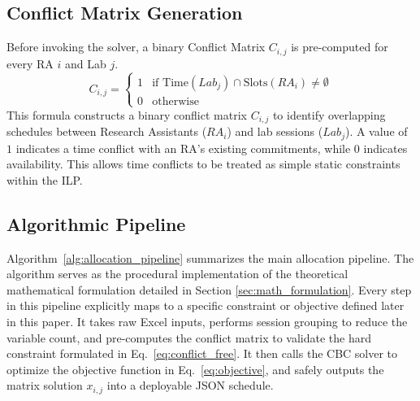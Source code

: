 \documentclass[journal,onecolumn]{IEEEtran}
\begin{document}
\subsection{Conflict Matrix Generation}
Before invoking the solver, a binary Conflict Matrix $C_{i,j}$ is pre-computed for every RA $i$ and Lab $j$.
\begin{equation}
C_{i,j} =
\begin{cases}
1 & \text{if } \text{Time}(Lab_j) \cap \text{Slots}(RA_i) \neq \emptyset \\
0 & \text{otherwise}
\end{cases}
\label{eq:conflict_matrix}
\end{equation}
This formula constructs a binary conflict matrix $C_{i,j}$ to identify overlapping schedules between Research Assistants ($RA_i$) and lab sessions ($Lab_j$). A value of $1$ indicates a time conflict with an RA's existing commitments, while $0$ indicates availability. This allows time conflicts to be treated as simple static constraints within the ILP.

\subsection{Algorithmic Pipeline}
Algorithm~\ref{alg:allocation_pipeline} summarizes the main allocation pipeline. The algorithm serves as the procedural implementation of the theoretical mathematical formulation detailed in Section \ref{sec:math_formulation}. Every step in this pipeline explicitly maps to a specific constraint or objective defined later in this paper. It takes raw Excel inputs, performs session grouping to reduce the variable count, and pre-computes the conflict matrix to validate the hard constraint formulated in Eq.~\eqref{eq:conflict_free}. It then calls the CBC solver to optimize the objective function in Eq.~\eqref{eq:objective}, and safely outputs the matrix solution $x_{i,j}$ into a deployable JSON schedule.
\end{document}
